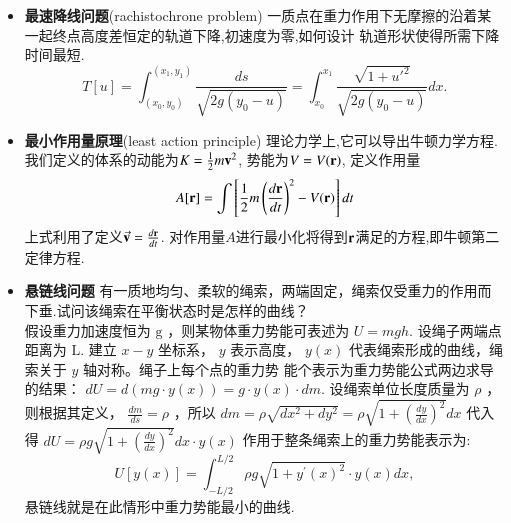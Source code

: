 \begin{itemize}
  \item \textbf{最速降线问题}(rachistochrone problem) 一质点在重力作用下无摩擦的沿着某一起终点高度差恒定的轨道下降,初速度为零,如何设计
  轨道形状使得所需下降时间最短.
  \begin{equation}
    T[u] = \int_{(x_0,y_0)}^{(x_1, y_1)} \frac{ds}{\sqrt{2 g(y_0 - u)}} = \int_{x_0}^{x_1} \frac{\sqrt{1+u'^2}}{\sqrt{2 g (y_0 - u)}} dx.
  \end{equation}

  \item \textbf{最小作用量原理}(least action principle) 理论力学上,它可以导出牛顿力学方程.我们定义的体系的动能为$K = {\frac{1}{2}} m {\mathbf{v}}^2$,
  势能为$V = V({\mathbf{r}})$, 定义作用量
  \begin{equation}
    A[{\mathbf{r}}] = \int \left[ {\frac{1}{2}} m \left( \frac{d{\mathbf{r}}}{dt} \right)^2 - V({\mathbf{r}}) \right] dt 
  \end{equation}
  上式利用了定义$\vec{{\mathbf{v}}} = \frac{d{\mathbf{r}}}{dt}$. 对作用量$A$进行最小化将得到${\mathbf{r}}$满足的方程,即牛顿第二定律方程.

  \item \textbf{悬链线问题} \quad 有一质地均匀、柔软的绳索，两端固定，绳索仅受重力的作用而下垂.试问该绳索在平衡状态时是怎样的曲线？\\
  假设重力加速度恒为 $\mathrm{g}$ ，则某物体重力势能可表述为 $U=m g h$. 设绳子两端点距离为 $\mathrm{L}$.
建立 $x-y$ 坐标系， $y$ 表示高度， $y(x)$ 代表绳索形成的曲线，绳索关于 $y$ 轴对称。绳子上每个点的重力势 能个表示为重力势能公式两边求导的结果： $d U=d(m g \cdot y(x))=g \cdot y(x) \cdot d m$.
设绳索单位长度质量为 $\rho$ ，则根据其定义， $\frac{d m}{d s}=\rho$ ，所以
$d m=\rho \sqrt{d x^2+d y^2}=\rho \sqrt{1+\left(\frac{d y}{d x}\right)^2} d x$
代入得 $d U=\rho g \sqrt{1+\left(\frac{d y}{d x}\right)^2} d x \cdot y(x)$
作用于整条绳索上的重力势能表示为:
$$
U[y(x)]=\int_{-L / 2}^{L / 2} \rho g \sqrt{1+y^{\prime}(x)^2} \cdot y(x) d x,
$$
悬链线就是在此情形中重力势能最小的曲线. 

\end{itemize}

